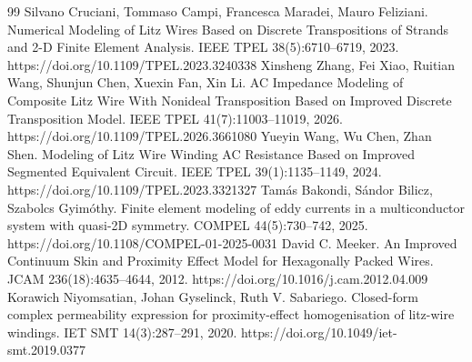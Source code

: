 \documentclass[11pt]{article}
\begin{document}
\clearpage
\begin{thebibliography}{99}
 Silvano Cruciani, Tommaso Campi, Francesca Maradei, Mauro Feliziani. Numerical Modeling of Litz Wires Based on Discrete Transpositions of Strands and 2-D Finite Element Analysis. IEEE TPEL 38(5):6710–6719, 2023. https://doi.org/10.1109/TPEL.2023.3240338
 Xinsheng Zhang, Fei Xiao, Ruitian Wang, Shunjun Chen, Xuexin Fan, Xin Li. AC Impedance Modeling of Composite Litz Wire With Nonideal Transposition Based on Improved Discrete Transposition Model. IEEE TPEL 41(7):11003–11019, 2026. https://doi.org/10.1109/TPEL.2026.3661080
 Yueyin Wang, Wu Chen, Zhan Shen. Modeling of Litz Wire Winding AC Resistance Based on Improved Segmented Equivalent Circuit. IEEE TPEL 39(1):1135–1149, 2024. https://doi.org/10.1109/TPEL.2023.3321327
 Tamás Bakondi, Sándor Bilicz, Szabolcs Gyimóthy. Finite element modeling of eddy currents in a multiconductor system with quasi-2D symmetry. COMPEL 44(5):730–742, 2025. https://doi.org/10.1108/COMPEL-01-2025-0031
 David C. Meeker. An Improved Continuum Skin and Proximity Effect Model for Hexagonally Packed Wires. JCAM 236(18):4635–4644, 2012. https://doi.org/10.1016/j.cam.2012.04.009
 Korawich Niyomsatian, Johan Gyselinck, Ruth V. Sabariego. Closed-form complex permeability expression for proximity-effect homogenisation of litz-wire windings. IET SMT 14(3):287–291, 2020. https://doi.org/10.1049/iet-smt.2019.0377
\end{thebibliography}
\end{document}
